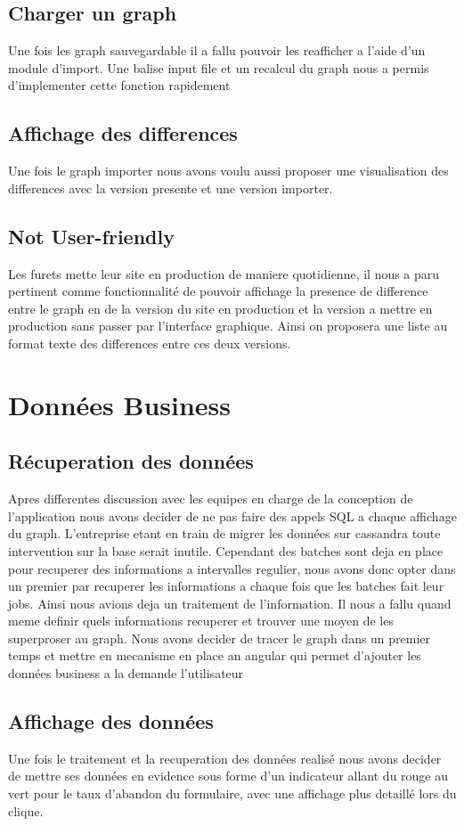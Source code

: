 \subsection{Charger un graph}
Une fois les graph sauvegardable il a fallu pouvoir les reafficher a l’aide d’un module d’import. Une balise input file et un recalcul du graph nous a permis d’implementer cette fonction rapidement

\subsection{Affichage des differences}
Une fois le graph importer nous avons voulu aussi proposer une visualisation des differences avec la version presente et une version importer.

\subsection{Not User-friendly}
Les furets mette leur site en production de maniere quotidienne, il nous a paru pertinent comme fonctionnalité de pouvoir affichage la presence de difference entre le graph en de la version du site en production et la version a mettre en production sans passer par l’interface graphique. Ainsi on proposera une liste au format texte des differences entre ces deux versions.

\section{Données Business}

\subsection{Récuperation des données}
Apres differentes discussion avec les equipes en charge de la conception de l’application nous avons decider de ne pas faire des appels SQL a chaque affichage du graph. L’entreprise etant en train de migrer les données sur cassandra toute intervention sur la base serait inutile.
Cependant des batches sont deja en place pour recuperer des informations a intervalles regulier, nous avons donc opter dans un premier par recuperer les informations a chaque fois que les batches fait leur jobs. Ainsi nous avions deja un traitement de l’information. Il nous a fallu quand meme definir quels informations recuperer et trouver une moyen de les superproser au graph. Nous avons decider de tracer le graph dans un premier temps et mettre en mecanisme en place an angular qui permet d’ajouter les données business a la demande l’utilisateur

\subsection{Affichage des données}
Une fois le traitement et la recuperation des données realisé nous avons decider de mettre ses données en evidence sous forme d'un indicateur allant du rouge au vert pour le taux d’abandon du formulaire, avec une affichage plus detaillé lors du clique. 